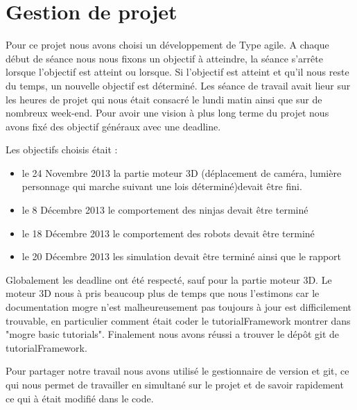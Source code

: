 \section{Gestion de projet}
\thispagestyle{fancy}
Pour ce projet nous avons choisi un développement de Type agile. A chaque début de séance nous nous fixons un objectif à atteindre, la séance s'arrête lorsque l'objectif est atteint ou lorsque. Si l'objectif est atteint et qu'il nous reste du temps, un nouvelle objectif est déterminé. Les séance de travail avait lieur sur les heures de projet qui nous était consacré le lundi matin ainsi que sur de nombreux week-end. Pour avoir une vision à plus long terme du projet nous avons fixé des objectif généraux avec une deadline. 

\noindent Les objectifs choisis était :
\begin{itemize}
\item le 24 Novembre 2013 la partie moteur 3D (déplacement de caméra, lumière personnage qui marche suivant une lois déterminé)devait être fini.
\item le 8 Décembre 2013 le comportement des ninjas devait être terminé
\item le 18 Décembre 2013 le comportement des robots devait être terminé
\item le 20 Décembre 2013 les simulation devait être terminé ainsi que le rapport
\end{itemize}

Globalement les deadline ont été respecté, sauf pour la partie moteur 3D. Le moteur 3D nous à pris beaucoup plus de temps que nous l'estimons car le documentation mogre n'est malheureusement pas toujours à jour est difficilement trouvable, en particulier comment était coder le tutorialFramework montrer dans "mogre basic tutorials". Finalement nous avons réussi a trouver le dépôt git de tutorialFramework.

Pour partager notre travail nous avons utilisé le gestionnaire de version et git, ce qui nous permet de travailler en simultané sur le projet et de savoir rapidement ce qui à était modifié dans le code. 

  